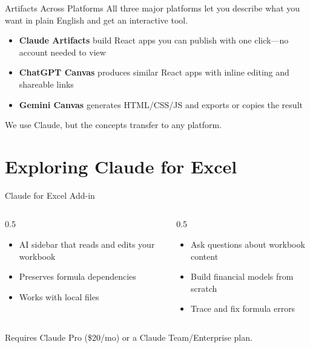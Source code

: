 \documentclass[aspectratio=169]{beamer}
\begin{document}
\begin{frame}{Artifacts Across Platforms}
All three major platforms let you describe what you want in plain English and get an interactive tool.

\begin{itemize}
  \item \textbf{Claude Artifacts} build React apps you can publish with one click---no account needed to view
  \item \textbf{ChatGPT Canvas} produces similar React apps with inline editing and shareable links
  \item \textbf{Gemini Canvas} generates HTML/CSS/JS and exports or copies the result
\end{itemize}

\vspace{0.3cm}
We use Claude, but the concepts transfer to any platform.
\end{frame}

\section{Exploring Claude for Excel}

\begin{frame}{Claude for Excel Add-in}
\begin{columns}[T]
\begin{column}{0.5\textwidth}
\begin{shadedbox}[title=\textbf{What It Does}]
\begin{itemize}\small
  \item AI sidebar that reads and edits your workbook
  \item Preserves formula dependencies
  \item Works with local files
\end{itemize}
\end{shadedbox}
\end{column}
\begin{column}{0.5\textwidth}
\begin{shadedbox}[title=\textbf{Capabilities}]
\begin{itemize}\small
  \item Ask questions about workbook content
  \item Build financial models from scratch
  \item Trace and fix formula errors
\end{itemize}
\end{shadedbox}
\end{column}
\end{columns}
\vspace{0.3cm}
Requires Claude Pro (\$20/mo) or a Claude Team/Enterprise plan.
\end{frame}
\end{document}
